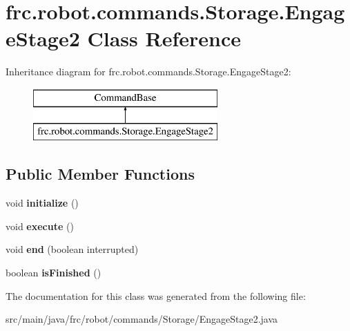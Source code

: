 \hypertarget{classfrc_1_1robot_1_1commands_1_1_storage_1_1_engage_stage2}{}\section{frc.\+robot.\+commands.\+Storage.\+Engage\+Stage2 Class Reference}
\label{classfrc_1_1robot_1_1commands_1_1_storage_1_1_engage_stage2}
Inheritance diagram for frc.\+robot.\+commands.\+Storage.\+Engage\+Stage2\+:\begin{figure}[H]
\begin{center}
\leavevmode
\includegraphics[height=2.000000cm]{classfrc_1_1robot_1_1commands_1_1_storage_1_1_engage_stage2}
\end{center}
\end{figure}
\subsection*{Public Member Functions}
\begin{DoxyCompactItemize}
\item 
\mbox{\label{classfrc_1_1robot_1_1commands_1_1_storage_1_1_engage_stage2_abc092497f40f247ed2de661dc73a5423}} 
void {\bfseries initialize} ()
\item 
\mbox{\label{classfrc_1_1robot_1_1commands_1_1_storage_1_1_engage_stage2_a02cb3eaed2311c9c4545b7802a4ba816}} 
void {\bfseries execute} ()
\item 
\mbox{\label{classfrc_1_1robot_1_1commands_1_1_storage_1_1_engage_stage2_addc27c1f29a2619419549b99fa634a1d}} 
void {\bfseries end} (boolean interrupted)
\item 
\mbox{\label{classfrc_1_1robot_1_1commands_1_1_storage_1_1_engage_stage2_aa944b217d01f24fee91dac3af6b3f806}} 
boolean {\bfseries is\+Finished} ()
\end{DoxyCompactItemize}


The documentation for this class was generated from the following file\+:\begin{DoxyCompactItemize}
\item 
src/main/java/frc/robot/commands/\+Storage/Engage\+Stage2.\+java\end{DoxyCompactItemize}
